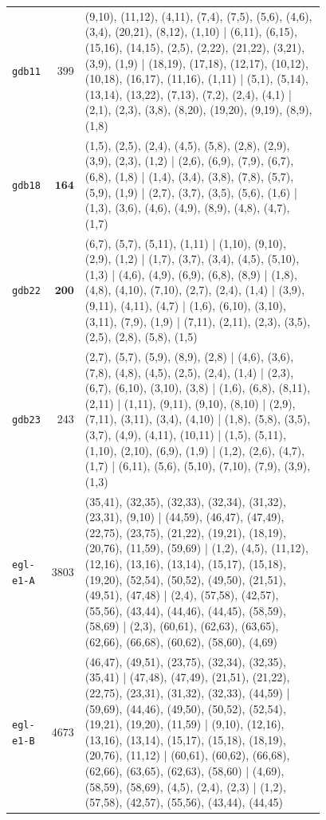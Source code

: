 \begin{landscape}
\begin{longtable}{lr>{\tiny\raggedright\arraybackslash}p{0.78\linewidth}}
\texttt{gdb11} & 399 & (9,10), (11,12), (4,11), (7,4), (7,5), (5,6), (4,6), (3,4), (20,21), (8,12), (1,10) | (6,11), (6,15), (15,16), (14,15), (2,5), (2,22), (21,22), (3,21), (3,9), (1,9) | (18,19), (17,18), (12,17), (10,12), (10,18), (16,17), (11,16), (1,11) | (5,1), (5,14), (13,14), (13,22), (7,13), (7,2), (2,4), (4,1) | (2,1), (2,3), (3,8), (8,20), (19,20), (9,19), (8,9), (1,8) \\[2pt]
\texttt{gdb18} & $\mathbf{164}$ & (1,5), (2,5), (2,4), (4,5), (5,8), (2,8), (2,9), (3,9), (2,3), (1,2) | (2,6), (6,9), (7,9), (6,7), (6,8), (1,8) | (1,4), (3,4), (3,8), (7,8), (5,7), (5,9), (1,9) | (2,7), (3,7), (3,5), (5,6), (1,6) | (1,3), (3,6), (4,6), (4,9), (8,9), (4,8), (4,7), (1,7) \\[2pt]
\texttt{gdb22} & $\mathbf{200}$ & (6,7), (5,7), (5,11), (1,11) | (1,10), (9,10), (2,9), (1,2) | (1,7), (3,7), (3,4), (4,5), (5,10), (1,3) | (4,6), (4,9), (6,9), (6,8), (8,9) | (1,8), (4,8), (4,10), (7,10), (2,7), (2,4), (1,4) | (3,9), (9,11), (4,11), (4,7) | (1,6), (6,10), (3,10), (3,11), (7,9), (1,9) | (7,11), (2,11), (2,3), (3,5), (2,5), (2,8), (5,8), (1,5) \\[2pt]
\texttt{gdb23} & 243 & (2,7), (5,7), (5,9), (8,9), (2,8) | (4,6), (3,6), (7,8), (4,8), (4,5), (2,5), (2,4), (1,4) | (2,3), (6,7), (6,10), (3,10), (3,8) | (1,6), (6,8), (8,11), (2,11) | (1,11), (9,11), (9,10), (8,10) | (2,9), (7,11), (3,11), (3,4), (4,10) | (1,8), (5,8), (3,5), (3,7), (4,9), (4,11), (10,11) | (1,5), (5,11), (1,10), (2,10), (6,9), (1,9) | (1,2), (2,6), (4,7), (1,7) | (6,11), (5,6), (5,10), (7,10), (7,9), (3,9), (1,3) \\[2pt]
\texttt{egl-e1-A} & 3803 & (35,41), (32,35), (32,33), (32,34), (31,32), (23,31), (9,10) | (44,59), (46,47), (47,49), (22,75), (23,75), (21,22), (19,21), (18,19), (20,76), (11,59), (59,69) | (1,2), (4,5), (11,12), (12,16), (13,16), (13,14), (15,17), (15,18), (19,20), (52,54), (50,52), (49,50), (21,51), (49,51), (47,48) | (2,4), (57,58), (42,57), (55,56), (43,44), (44,46), (44,45), (58,59), (58,69) | (2,3), (60,61), (62,63), (63,65), (62,66), (66,68), (60,62), (58,60), (4,69) \\[2pt]
\texttt{egl-e1-B} & 4673 & (46,47), (49,51), (23,75), (32,34), (32,35), (35,41) | (47,48), (47,49), (21,51), (21,22), (22,75), (23,31), (31,32), (32,33), (44,59) | (59,69), (44,46), (49,50), (50,52), (52,54), (19,21), (19,20), (11,59) | (9,10), (12,16), (13,16), (13,14), (15,17), (15,18), (18,19), (20,76), (11,12) | (60,61), (60,62), (66,68), (62,66), (63,65), (62,63), (58,60) | (4,69), (58,59), (58,69), (4,5), (2,4), (2,3) | (1,2), (57,58), (42,57), (55,56), (43,44), (44,45) \\[2pt]

\end{longtable}
\end{landscape}
